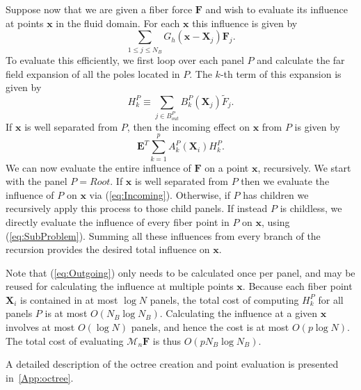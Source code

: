 \documentclass[preprint,12pt]{elsarticle}
\newcommand{\full}{\displaystyle}
\newcommand{\B}[1]{\mathbf{#1}}
\newcommand{\C}[1]{\mathcal{#1}}
\newcommand{\Panel}[1]{#1}
\begin{document}
Suppose now that we are given a fiber force $\B{F}$ and wish to evaluate its influence at points $\B{x}$ in the fluid domain. For each $\B{x}$ this influence is given by
\begin{equation}
\sum_{1\leq j\leq N_B} G_h(\B{x} - \B{X}_j) \B{F}_j.
\end{equation}
To evaluate this efficiently, we first loop over each panel $\Panel{P}$ and calculate the far field expansion of all the poles located in 
$\Panel{P}$. The $k$-th term of this expansion is given by
\begin{equation}
H_k^P \equiv \sum_{j\in B_{out}^P}
B_k^P(\B{X}_j) \tilde{F}_j.
\label{eq:Outgoing}
\end{equation}
If $\B{x}$ is well separated from $\Panel{P}$, then the incoming effect on $\B{x}$ from $\Panel{P}$ is given by
\begin{equation}
\B{E}^T \full\sum_{k=1}^{p}A_k^P(\B{X}_i)H_k^P.
\label{eq:Incoming}
\end{equation}
We can now evaluate the entire influence of $\B{F}$ on a point $\B{x}$, recursively.   We start with the panel $\Panel{P}=\Panel{Root}$. If $\B{x}$ is well separated from $\Panel{P}$ then we evaluate the influence of $\Panel{P}$ on $\B{x}$ via (\ref{eq:Incoming}). Otherwise, if $\Panel{P}$ has children we recursively apply this process to those child panels. If instead $\Panel{P}$ is childless, we directly evaluate the influence of every fiber point in $\Panel{P}$ on $\B{x}$, using (\ref{eq:SubProblem}). Summing all these influences from every branch of the recursion provides the desired total influence on $\B{x}$.

Note that (\ref{eq:Outgoing}) only needs to be calculated once per panel, and may be reused for calculating the influence at multiple points $\B{x}$. Because each fiber point $\B{X}_i$ is contained in at most $\log N$ panels, the total cost of computing $H_k^P$ for all panels $\Panel{P}$ is at most $O(N_B\log N_B)$. Calculating the influence at a given $\B{x}$ involves at most $O(\log N)$ panels, and hence the cost is at most $O(p\log N)$. The total cost of evaluating $\C{M}_n\B{F}$ is thus $O(pN_B\log N_B)$.

A detailed description of the octree creation and point evaluation is presented in~\ref{App:octree}.
\end{document}
